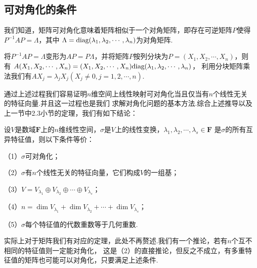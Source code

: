 \subsection{可对角化的条件}
我们知道，矩阵可对角化意味着矩阵相似于一个对角矩阵，即存在可逆矩阵$P$使得$P^{-1}AP=\Lambda$，其中
$\Lambda=\textup{diag}(\lambda_1,\lambda_2,\cdots,\lambda_n)$为对角矩阵.

将$P^{-1}AP=\Lambda$变形为$AP=P\Lambda$，并将矩阵$P$按列分块为$P=(X_1,X_2,\cdots,X_n)$，则有
$A(X_1,X_2,\cdots,X_n)=(X_1,X_2,\cdots,X_n)\textup{diag}(\lambda_1,\lambda_2,\cdots,\lambda_n)$，
利用分块矩阵乘法我们有$AX_j=\lambda_jX_j(X_j\neq 0,j=1,2,\cdots,n)$.

通过上述过程我们容易证明$n$维空间上线性映射可对角化当且仅当有$n$个线性无关的特征向量.并且这一过程也是我们
求解对角化问题的基本方法.综合上述推导以及上一节中2.3小节的定理，我们有如下结论：
\begin{theorem}
	设$V$是数域$\mathbf{F}$上的$n$维线性空间，$\sigma$是$V$上的线性变换，$\lambda_1,\lambda_2,\cdots,\lambda_s\in\mathbf{F}$
	是$\sigma$的所有互异特征值，则以下条件等价：
	
	\textup{（1）}$\sigma$可对角化\textup{；}
	
	\textup{（2）}$\sigma$有$n$个线性无关的特征向量，它们构成$V$的一组基\textup{；}
	
	\textup{（3）}$V=V_{\lambda_1}\oplus V_{\lambda_2}\oplus\cdots\oplus V_{\lambda_s}$\textup{；}
	
	\textup{（4）}$n=\dim V_{\lambda_1}+\dim V_{\lambda_2}+\cdots+\dim V_{\lambda_s}$\textup{；}
	
	\textup{（5）}$\sigma$每个特征值的代数重数等于几何重数\textup{.}
\end{theorem}
实际上对于矩阵我们有对应的定理，此处不再赘述.我们有一个推论，若有$n$个互不相同的特征值则一定能对角化，
这是（2）的直接推论，但反之不成立，有多重特征值的矩阵也可能可以对角化，只要满足上述条件.

